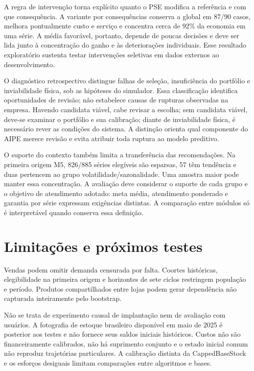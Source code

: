 \documentclass[preprint,12pt]{elsarticle}
\begin{document}
A regra de intervenção torna explícito quanto o PSE modifica a referência e com que consequência. A variante por consequências conserva a global em 87/90 casos, melhora pontualmente custo e serviço e concentra cerca de 92\% da economia em uma série. A média favorável, portanto, depende de poucas decisões e deve ser lida junto à concentração do ganho e às deteriorações individuais. Esse resultado exploratório sustenta testar intervenções seletivas em dados externos ao desenvolvimento.

O diagnóstico retrospectivo distingue falhas de seleção, insuficiência do portfólio e inviabilidade física, sob as hipóteses do simulador. Essa classificação identifica oportunidades de revisão; não estabelece causas de rupturas observadas na empresa. Havendo candidata viável, cabe revisar a escolha; sem candidata viável, deve-se examinar o portfólio e sua calibração; diante de inviabilidade física, é necessário rever as condições do sistema. A distinção orienta qual componente do AIPE merece revisão e evita atribuir toda ruptura ao modelo preditivo.

O suporte do contexto também limita a transferência das recomendações. Na primeira origem M5, 826/885 séries elegíveis são esparsas, 57 têm tendência e duas pertencem ao grupo volatilidade/sazonalidade. Uma amostra maior pode manter essa concentração. A avaliação deve considerar o suporte de cada grupo e o objetivo de atendimento adotado: meta média, atendimento ponderado e garantia por série expressam exigências distintas. A comparação entre módulos só é interpretável quando conserva essa definição.

\section{Limitações e próximos testes}
Vendas podem omitir demanda censurada por falta. Coortes históricas, elegibilidade na primeira origem e horizontes de sete ciclos restringem população e período. Produtos compartilhados entre lojas podem gerar dependência não capturada inteiramente pelo bootstrap.

Não se trata de experimento causal de implantação nem de avaliação com usuários. A fotografia de estoque brasileiro disponível em maio de 2025 é posterior aos testes e não fornece seus saldos iniciais históricos. Custos não são financeiramente calibrados, não há suprimento conjunto e o estado inicial comum não reproduz trajetórias particulares. A calibração distinta da CappedBaseStock e os esforços desiguais limitam comparações entre algoritmos e bases.
\end{document}
